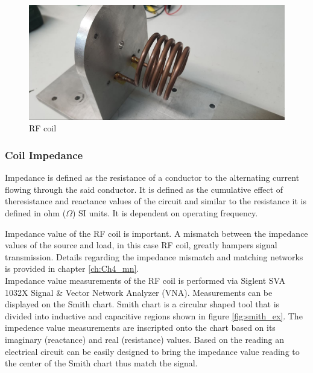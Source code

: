 \begin{figure}[ht]
    \centering
    \includegraphics[scale=0.35]{fig/realcoil.jpeg}
    \caption{RF coil}
    \label{fig:coil_real}
\end{figure}

\subsubsection{Coil Impedance}

Impedance is defined as the resistance of a conductor to the alternating current flowing through the said conductor. It is defined as the cumulative   effect of theresistance and reactance values of the circuit and similar to the resistance it is defined in ohm ($\Omega$) SI units. It is dependent on operating frequency.

Impedance value of the RF coil is important. A mismatch between the impedance values of the source and load, in this case RF coil, greatly hampers signal transmission. Details regarding the impedance mismatch and matching networks is provided in chapter \ref{ch:Ch4_mn}.\\

Impedance value measurements of the RF coil is performed via Siglent SVA 1032X Signal \& Vector Network Analyzer (VNA). Measurements can be displayed on the Smith chart. Smith chart is a circular shaped tool that is divided into inductive and capacitive regions shown in figure \ref{fig:smith_ex}. The impedence value measurements are inscripted onto the chart based on its imaginary (reactance) and real (resistance) values. Based on the reading an electrical circuit can be easily designed to bring the impedance value reading to the center of the Smith chart thus match the signal. 

